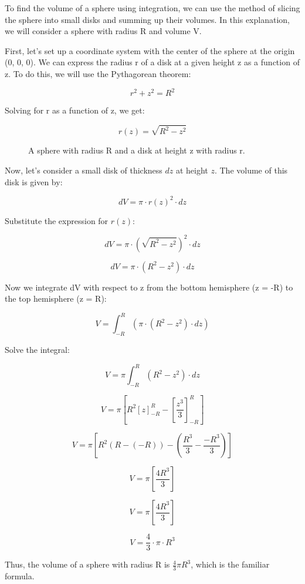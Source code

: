 \documentclass{article}
\begin{document}
	
	To find the volume of a sphere using integration, we can use the method of slicing the sphere into small disks and summing up their volumes. In this explanation, we will consider a sphere with radius R and volume V.
	
	First, let's set up a coordinate system with the center of the sphere at the origin (0, 0, 0). We can express the radius r of a disk at a given height z as a function of z. To do this, we will use the Pythagorean theorem:
	
	\[r^2 + z^2 = R^2\]
	
	Solving for r as a function of z, we get:
	
	\[r(z) = \sqrt{R^2 - z^2}\]
	
	\begin{figure}[h]
		\centering
		\caption{A sphere with radius R and a disk at height z with radius r.}
	\end{figure}
	
	
	Now, let's consider a small disk of thickness $dz$ at height $z$. The volume of this disk is given by:
	
	\[dV = \pi \cdot r(z)^2 \cdot dz\]
	
	Substitute the expression for $r(z)$:
	
	\[dV = \pi \cdot \left(\sqrt{R^2 - z^2}\right)^2 \cdot dz\]
	
	\[dV = \pi \cdot (R^2 - z^2) \cdot dz\]
	
	Now we integrate dV with respect to z from the bottom hemisphere (z = -R) to the top hemisphere (z = R):
	
	\[V = \int_{-R}^{R}(\pi \cdot (R^2 - z^2) \cdot dz)\]
	
	Solve the integral:
	
	\[V = \pi \int_{-R}^{R}(R^2 - z^2) \cdot dz\]
	
	\[V = \pi \left[R^2 \left[z\right]_{-R}^{R} - \left[\frac{z^3}{3}\right]_{-R}^{R}\right]\]
	
	\[V = \pi \left[R^2 (R - (-R)) - \left(\frac{R^3}{3} - \frac{-R^3}{3}\right)\right]\]
	
	\[V = \pi \left[\frac{4R^3}{3}\right]\]
	
	\[V = \pi \left[\frac{4R^3}{3}\right]\]
	
	
	\[V = \frac{4}{3} \cdot \pi \cdot R^3\]
	
	Thus, the volume of a sphere with radius R is $\frac{4}{3}\pi R^3$, which is the familiar formula.
	
\end{document}
